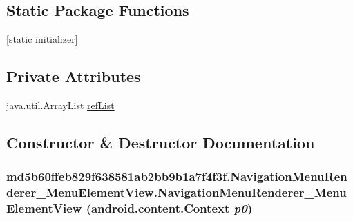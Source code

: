 \subsection*{Static Package Functions}
\begin{CompactItemize}
\item 
\hyperlink{classmd5b60ffeb829f638581ab2bb9b1a7f4f3f_1_1_navigation_menu_renderer___menu_element_view_7e1d126fb7f0fdd246a90cd2b0b09014}{\mbox{[}static initializer\mbox{]}}
\end{CompactItemize}
\subsection*{Private Attributes}
\begin{CompactItemize}
\item 
java.util.ArrayList \hyperlink{classmd5b60ffeb829f638581ab2bb9b1a7f4f3f_1_1_navigation_menu_renderer___menu_element_view_87d2c9304a1e94e25442bab9d20cb5a8}{refList}
\end{CompactItemize}


\subsection{Constructor \& Destructor Documentation}
\hypertarget{classmd5b60ffeb829f638581ab2bb9b1a7f4f3f_1_1_navigation_menu_renderer___menu_element_view_0c5cb8c6adfb8c38c5cafccdc1af874f}{
\subsubsection[{NavigationMenuRenderer\_\-MenuElementView}]{\setlength{\rightskip}{0pt plus 5cm}md5b60ffeb829f638581ab2bb9b1a7f4f3f.NavigationMenuRenderer\_\-MenuElementView.NavigationMenuRenderer\_\-MenuElementView (android.content.Context {\em p0})}}
\label{classmd5b60ffeb829f638581ab2bb9b1a7f4f3f_1_1_navigation_menu_renderer___menu_element_view_0c5cb8c6adfb8c38c5cafccdc1af874f}


